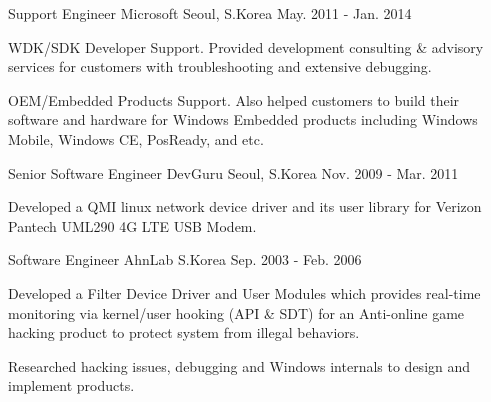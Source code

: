 \begin{cventries}
  \cventry
    {Support Engineer} %
    {Microsoft} %
    {Seoul, S.Korea} %
    {May. 2011 - Jan. 2014} %
    {
      \begin{cvitems} %
        \item {WDK/SDK Developer Support. Provided development consulting \& advisory services for customers with troubleshooting and extensive debugging.}
        \item {OEM/Embedded Products Support. Also helped customers to build their software and hardware for Windows Embedded products including Windows Mobile, Windows CE, PosReady, and etc.}
      \end{cvitems} 
    }

  \cventry
    {Senior Software Engineer} %
    {DevGuru} %
    {Seoul, S.Korea} %
    {Nov. 2009 - Mar. 2011} %
    {
      \begin{cvitems} %
        \item {Developed a QMI linux network device driver and its user library for Verizon Pantech UML290 4G LTE USB Modem.}
      \end{cvitems}
    }

  \cventry
    {Software Engineer} %
    {AhnLab} %
    {S.Korea} %
    {Sep. 2003 - Feb. 2006} %
    {
      \begin{cvitems} %
        \item {Developed a Filter Device Driver and User Modules which provides real-time monitoring via kernel/user hooking (API \& SDT) for an Anti-online game hacking product to protect system from illegal behaviors.}
        \item {Researched hacking issues, debugging and Windows internals to design and implement products.}
      \end{cvitems}
    }


\end{cventries}
